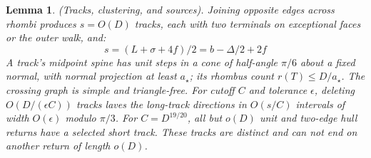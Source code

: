 \documentclass[10pt,reqno]{amsart}
\newtheorem{lemma}{Lemma}[section]
\begin{document}
\begin{lemma}
    (Tracks, clustering, and sources). Joining opposite edges across rhombi produces $s = O(D)$ tracks, each with two terminals on exceptional faces or the outer walk, and:
    \begin{equation}
        s = (L + \sigma + 4f) / 2 = b - \Delta / 2 + 2f
    \end{equation}
    A track's midpoint spine has unit steps in a cone of half-angle $\pi / 6$ about a fixed normal, with normal projection at least $a_\star$; its rhombus count $r(T) \le D / a_\star$. The crossing graph is simple and triangle-free. For cutoff $C$ and tolerance $\epsilon$, deleting $O(D / (\epsilon C))$ tracks laves the long-track directions in $O(s / C)$ intervals of width $O(\epsilon)$ modulo $\pi / 3$. For $C = D^{19/20}$, all but $o(D)$ unit and two-edge hull returns have a selected short track. These tracks are distinct and can not end on another return of length $o(D)$.
\end{lemma}
\end{document}
